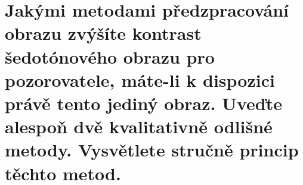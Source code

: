 \section{Jakými metodami předzpracování obrazu zvýšíte kontrast šedotónového obrazu pro pozorovatele, máte-li k 
dispozici právě tento jediný obraz. Uveďte alespoň dvě kvalitativně odlišné metody. Vysvětlete stručně princip těchto 
metod.}